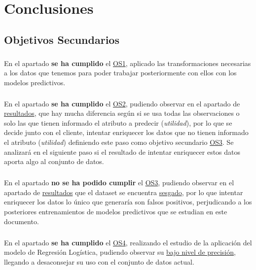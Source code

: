 \chapter{Conclusiones}
\label{chapter:conclusiones}

\section{Objetivos Secundarios}

\paragraph{}
En el apartado  \textbf{se ha cumplido} el \hyperref[os:OS1]{OS1}, aplicado las transformaciones necesarias a los datos que tenemos para poder trabajar posteriormente con ellos con los modelos predictivos.

\paragraph{}
En el apartado  \textbf{se ha cumplido} el \hyperref[os:OS2]{OS2}, pudiendo observar en el apartado de \hyperref[resultados:pca]{resultados}, que hay mucha diferencia según si se usa todas las observaciones o solo las que tienen informado el atributo a predecir (\textit{utilidad}), por lo que se decide junto con el cliente, intentar enriquecer los datos que no tienen informado el atributo (\textit{utilidad}) definiendo este paso como objetivo secundario \hyperref[os:OS3]{OS3}. Se analizará en el siguiente paso si el resultado de intentar enriquecer estos datos aporta algo al conjunto de datos.

\paragraph{}
En el apartado  \textbf{no se ha podido cumplir} el \hyperref[os:OS3]{OS3}, pudiendo observar en el apartado de \hyperref[resultados:knn_conclusiones]{resultados} que el dataset se encuentra \hyperref[resultados:knn]{sesgado}, por lo que intentar enriquecer los datos lo único que generaría son falsos positivos, perjudicando a los posteriores entrenamientos de modelos predictivos que se estudian en este documento.

\paragraph{}
En el apartado  \textbf{se ha cumplido} el \hyperref[os:OS4]{OS4}, realizando el estudio de la aplicación del modelo de Regresión Logística, pudiendo observar su \hyperref[resultados:lr]{bajo nivel de precisión}, llegando a desaconsejar su uso con el conjunto de datos actual.

